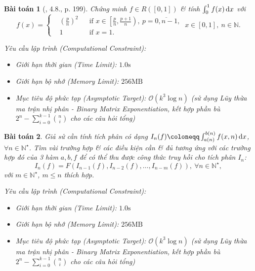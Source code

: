 \documentclass{article}
\newtheorem{baitoan}{Bài toán}
\begin{document}
\begin{baitoan}[\cite{Quoc_Long_Dat_Nam_VMC}, 4.8., p. 199]
	Chứng minh $f\in R([0,1])$ \& tính $\int_0^1 f(x)\,{\rm d}x$ với
	\begin{equation*}
		f(x) = \left\{\begin{split}
			&\left(\frac{p}{n}\right)^2&&\mbox{if } x\in\left[\frac{p}{n},\frac{p + 1}{n}\right),\ p = \overline{0,n-1},\\
			&1&&\mbox{if } x = 1.
		\end{split}\right.\ x\in[0,1],\ n\in\mathbb{N}.
	\end{equation*}

    \vspace{0.5em}
    \emph{Yêu cầu lập trình (Computational Constraint):}
    \begin{itemize}
        \item Giới hạn thời gian (Time Limit): $1.0\mathrm{s}$
        \item Giới hạn bộ nhớ (Memory Limit): $256\mathrm{MB}$
        \item Mục tiêu độ phức tạp (Asymptotic Target): $\mathcal{O}(k^3 \log n)$ (sử dụng Lũy thừa ma trận nhị phân - Binary Matrix Exponentiation, kết hợp phần bù $2^n - \sum_{i=0}^{k-1} \binom{n}{i}$ cho các câu hỏi tổng)
    \end{itemize}
\end{baitoan}


\begin{baitoan}
	Giả sử cần tính tích phân có dạng $I_n(f)\coloneqq\int_{a(n)}^{b(n)} f(x,n)\,{\rm d}x$, $\forall n\in\mathbb{N}^\star$. Tìm vài trường hợp \& các điều kiện cần \& đủ tương ứng với các trường hợp đó của 3 hàm $a,b,f$ để có thể thu được công thức truy hồi cho tích phân $I_n$:
	\begin{equation*}
		I_n(f) = F(I_{n-1}(f),I_{n-2}(f),\ldots,I_{n-m}(f)),\ \forall n\in\mathbb{N}^\star,
	\end{equation*}
	với $m\in\mathbb{N}^\star$, $m\le n$ thích hợp.

    \vspace{0.5em}
    \emph{Yêu cầu lập trình (Computational Constraint):}
    \begin{itemize}
        \item Giới hạn thời gian (Time Limit): $1.0\mathrm{s}$
        \item Giới hạn bộ nhớ (Memory Limit): $256\mathrm{MB}$
        \item Mục tiêu độ phức tạp (Asymptotic Target): $\mathcal{O}(k^3 \log n)$ (sử dụng Lũy thừa ma trận nhị phân - Binary Matrix Exponentiation, kết hợp phần bù $2^n - \sum_{i=0}^{k-1} \binom{n}{i}$ cho các câu hỏi tổng)
    \end{itemize}
\end{baitoan}
\end{document}
